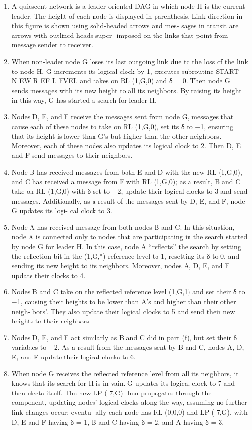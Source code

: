 \begin{enumerate}[label=\alph *)]
\item A quiescent network is a leader-oriented DAG in
which node H is the current leader. The height of each
node is displayed in parenthesis. Link direction in this
figure is shown using solid-headed arrows and mes-
sages in transit are arrows with outlined heads super-
imposed on the links that point from message sender
to receiver.
\item When non-leader node G loses its last outgoing link
due to the loss of the link to node H, G increments
its logical clock by 1, executes subroutine START -
N EW R EF L EVEL and takes on RL (1,G,0) and δ = 0.
Then node G sends messages with its new height to all
its neighbors. By raising its height in this way, G has
started a search for leader H.
\item Nodes D, E, and F receive the messages sent from node
G, messages that cause each of these nodes to take on
RL (1,G,0), set its δ to −1, ensuring that its height is
lower than G’s but higher than the other neighbors’.
Moreover, each of these nodes also updates its logical
clock to 2. Then D, E and F send messages to their
neighbors.
\item Node B has received messages from both E and D with
the new RL (1,G,0), and C has received a message
from F with RL (1,G,0); as a result, B and C take on
RL (1,G,0) with δ set to −2, update their logical clocks
to 3 and send messages. Additionally, as a result of the
messages sent by D, E, and F, node G updates its logi-
cal clock to 3.
\item Node A has received message from both nodes B and
C. In this situation, node A is connected only to nodes
that are participating in the search started by node G
for leader H. In this case, node A “reflects” the search
by setting the reflection bit in the (1,G,*) reference
level to 1, resetting its δ to 0, and sending its new
height to its neighbors. Moreover, nodes A, D, E, and
F update their clocks to 4.
\item Nodes B and C take on the reflected reference level
(1,G,1) and set their δ to −1, causing their heights to
be lower than A’s and higher than their other neigh-
bors’. They also update their logical clocks to 5 and
send their new heights to their neighbors.
\item Nodes D, E, and F act similarly as B and C did in part
(f), but set their δ variables to −2. As a result from
the messages sent by B and C, nodes A, D, E, and F
update their logical clocks to 6.
\item When node G receives the reflected reference level
from all its neighbors, it knows that its search for H is
in vain. G updates its logical clock to 7 and then elects
itself. The new LP (-7,G) then propagates through the
component, updating nodes’ logical clocks along the
way, assuming no further link changes occur; eventu-
ally each node has RL (0,0,0) and LP (-7,G), with D,
E and F having δ = 1, B and C having δ = 2, and A
having δ = 3.
\end{enumerate}


